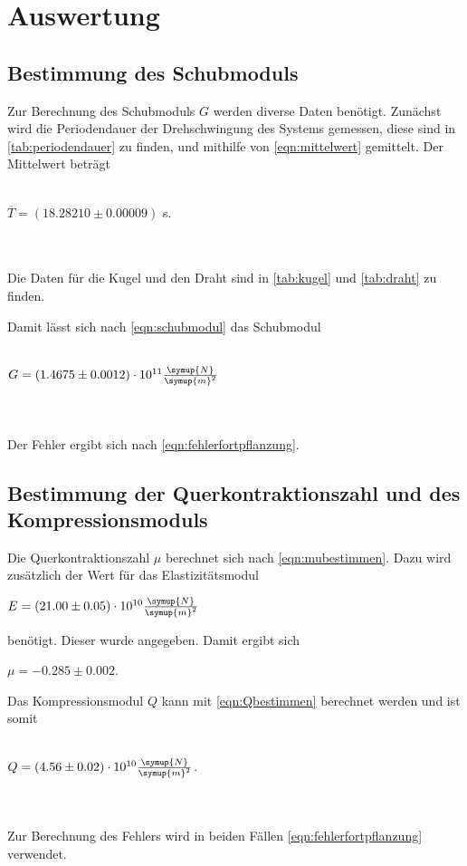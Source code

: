 \section{Auswertung}
\label{sec:Auswertung}
\subsection{Bestimmung des Schubmoduls}



Zur Berechnung des Schubmoduls $G$ werden diverse Daten benötigt. Zunächst wird die Periodendauer der Drehschwingung des Systems gemessen, diese sind in \autoref{tab:periodendauer} zu finden, und mithilfe von \eqref{eqn:mittelwert} gemittelt. Der Mittelwert beträgt
\\ \\
\centerline{$\overline{T} = (18.28210 \pm 0.00009)$ s.}
\\ \\
Die Daten für die Kugel und den Draht sind in \autoref{tab:kugel} und \autoref{tab:draht} zu finden.





Damit lässt sich nach \eqref{eqn:schubmodul} das Schubmodul
\\ \\
\centerline{$G = (1.4675 \pm 0.0012) \cdot 10^{11} \frac{\symup{N}}{\symup{m}^2}$}
\\ \\
Der Fehler ergibt sich nach \eqref{eqn:fehlerfortpflanzung}.

\subsection{Bestimmung der Querkontraktionszahl und des Kompressionsmoduls}

Die Querkontraktionszahl $\mu$ berechnet sich nach \eqref{eqn:mubestimmen}. Dazu wird zusätzlich der Wert für das Elastizitätsmodul 

\centerline{$E = (21.00 \pm 0.05) \cdot 10^{10} \frac{\symup{N}}{\symup{m}^2}$}
benötigt. Dieser wurde angegeben. Damit ergibt sich 

\centerline{$\mu = -0.285 \pm 0.002$.}
Das Kompressionsmodul $Q$ kann mit \eqref{eqn:Qbestimmen} berechnet werden und ist somit
\\ \\
\centerline{$Q = (4.56 \pm 0.02) \cdot 10^{10} \frac{\symup{N}}{\symup{m}^2}$.}
\\ \\
Zur Berechnung des Fehlers wird in beiden Fällen \eqref{eqn:fehlerfortpflanzung} verwendet.


